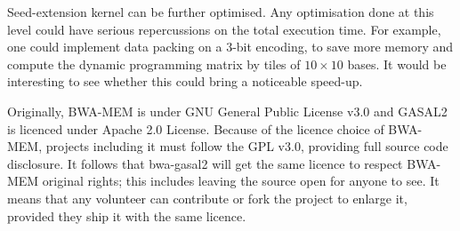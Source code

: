 

Seed-extension kernel can be further optimised. Any optimisation done at this level could have serious repercussions on the total execution time. For example, one could implement data packing on a 3-bit encoding, to save more memory and compute the dynamic programming matrix by tiles of $10 \times 10$ bases. It would be interesting to see whether this could bring a noticeable speed-up.

Originally, BWA-MEM is under GNU General Public License v3.0 and GASAL2 is licenced under Apache 2.0 License. Because of the licence choice of BWA-MEM, projects including it must follow the GPL v3.0, providing full source code disclosure. It follows that bwa-gasal2 will get the same licence to respect BWA-MEM original rights; this includes leaving the source open for anyone to see. It means that any volunteer can contribute or fork the project to enlarge it, provided they ship it with the same licence.